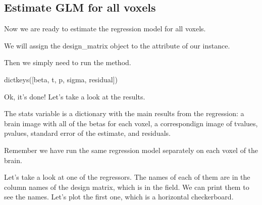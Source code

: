 \documentclass[letterpaper,10pt,english]{sphinxmanual}
\begin{document}
\subsection{Estimate GLM for all voxels}
\label{\detokenize{content/GLM_Single_Subject_Model:estimate-glm-for-all-voxels}}
Now we are ready to estimate the regression model for all voxels.

We will assign the design\_matrix object to the  attribute of our  instance.

Then we simply need to run the  method.

\begin{sphinxVerbatim}[commandchars=\\\{\}]
  
  

\end{sphinxVerbatim}

\begin{sphinxVerbatim}[commandchars=\\\{\}]
dict\PYGZus{}keys([\PYGZsq{}beta\PYGZsq{}, \PYGZsq{}t\PYGZsq{}, \PYGZsq{}p\PYGZsq{}, \PYGZsq{}sigma\PYGZsq{}, \PYGZsq{}residual\PYGZsq{}])
\end{sphinxVerbatim}

Ok, it’s done! Let’s take a look at the results.

The stats variable is a dictionary with the main results from the regression: a brain image with all of the betas for each voxel, a correspondign image of t\sphinxhyphen{}values, p\sphinxhyphen{}values, standard error of the estimate, and residuals.

Remember we have run the same regression model separately on each voxel of the brain.

Let’s take a look at one of the regressors. The names of each of them are in the column names of the design matrix, which is in the  field.  We can print them to see the names. Let’s plot the first one, which is a horizontal checkerboard.

\begin{sphinxVerbatim}[commandchars=\\\{\}]
\end{sphinxVerbatim}
\end{document}
